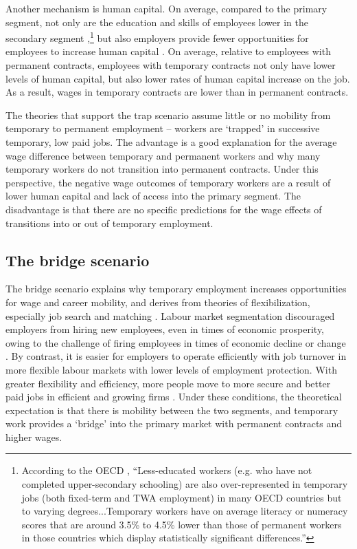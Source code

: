 \documentclass[12pt]{article}
\begin{document}
Another mechanism is human capital.  On average, compared to the primary segment, not only are the education and skills of employees lower in the secondary segment \citep[Fig. 4.6]{oecd_oecd_2014},\footnote{According to the OECD \citep[pg. 155]{oecd_oecd_2014}, ``Less-educated workers (e.g. who have not completed upper-secondary schooling) are also over-represented in temporary jobs (both fixed-term and TWA employment) in many OECD countries but to varying degrees...Temporary workers have on average literacy or numeracy scores that are around 3.5\% to 4.5\% lower than those of permanent workers in those countries which display statistically significant differences.''} but also employers provide fewer opportunities for employees to increase human capital \citep{adolfsson_temporary_2022}.  On average, relative to employees with permanent contracts, employees with temporary contracts not only have lower levels of human capital, but also lower rates of human capital increase on the job.  As a result, wages in temporary contracts are lower than in permanent contracts.  

The theories that support the trap scenario assume little or no mobility from temporary to permanent employment -- workers are `trapped' in successive temporary, low paid jobs. The advantage is a good explanation for the average wage difference between temporary and permanent workers and why many temporary workers do not transition into permanent contracts.  Under this perspective, the negative wage outcomes of temporary workers are a result of lower human capital and lack of access into the primary segment.  The disadvantage is that there are no specific predictions for the wage effects of transitions into or out of temporary employment.  

\subsection{The bridge scenario}

The bridge scenario explains why temporary employment increases opportunities for wage and career mobility, and derives from theories of flexibilization, especially job search \citep{lippman_economics_1976} and matching \citep{sorensen_outline_2018}.  Labour market segmentation discouraged employers from hiring new employees, even in times of economic prosperity, owing to the challenge of firing employees in times of economic decline or change \citep{lazear_1990}.  By contrast, it is easier for employers to operate efficiently with job turnover in more flexible labour markets with lower levels of employment protection.  With greater flexibility and efficiency, more people move to more secure and better paid jobs in efficient and growing firms \citep{kalleberg_2001}.  Under these conditions, the theoretical expectation is that there is mobility between the two segments, and temporary work provides a `bridge' into the primary market with permanent contracts and higher wages.  
\end{document}
